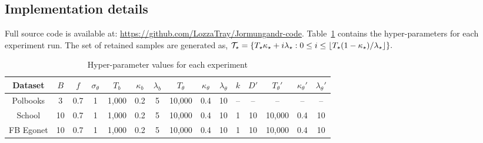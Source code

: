 \subsection{Implementation details}
\label{appdx:hyperparams}

Full source code is available at:
\url{https://github.com/LozzaTray/Jormungandr-code}. Table~\ref{tab:hyperparams} contains the hyper-parameters for each experiment run. The set of retained samples are generated as,
$
	\mathcal{T}_\star = \{T_\star \kappa_\star + i \lambda_\star :  
	0 \leq i \leq \lfloor T_\star(1 - \kappa_\star) / \lambda_\star \rfloor \}.
$
%
\begin{table}[!h]
	\centering
	\caption{Hyper-parameter values for each experiment}
	\label{tab:hyperparams}
	\begin{tabular}{c|ccc|ccc|ccc|cc|ccc}
		Dataset & 
		$B$ & $f$ & $\sigma_\theta$ & 
		$T_b$ & $\kappa_b$ & $\lambda_b$ & 
		$T_\theta$ & $\kappa_\theta$ & $\lambda_\theta$ & %
		$k$ & $D'$ &
		$T_\theta'$ & $\kappa_\theta'$ & $\lambda_\theta'$ %
		\\ \hline
		Polbooks &
		3 & 0.7 & 1 &
		1,000 & 0.2 & 5 &
		10,000 & 0.4 & 10 & %
		-- & -- & 
		-- & -- & -- %
		\\
		School &
		10 & 0.7 & 1 &
		1,000 & 0.2 & 5 &
		10,000 & 0.4 & 10 & %
		1 & 10 & 
		10,000 & 0.4 & 10 %
		\\
		FB Egonet &
		10 & 0.7 & 1 &
		1,000 & 0.2 & 5 &
		10,000 & 0.4 & 10 & %
		1 & 10 & 
		10,000 & 0.4 & 10 %
		\\
	\end{tabular}
\end{table}